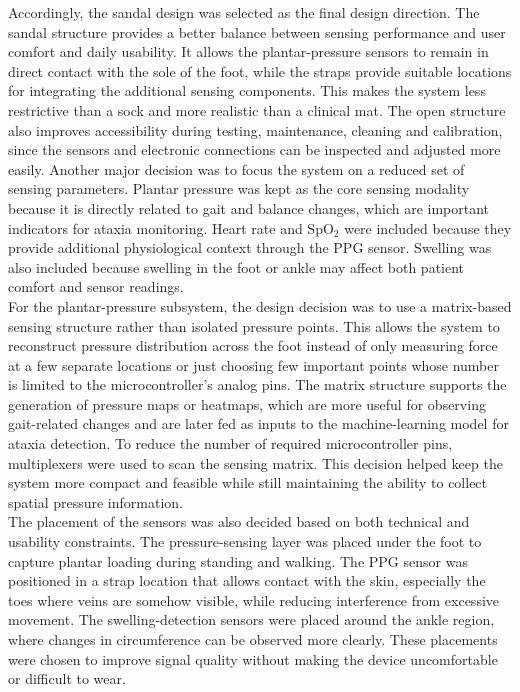 Accordingly, the sandal design was selected as the final design direction. The sandal structure provides a better balance between sensing performance and user comfort and daily usability. It allows the plantar-pressure sensors to remain in direct contact with the sole of the foot, while the straps provide suitable locations for integrating the additional sensing components. This makes the system less restrictive than a sock and more realistic than a clinical mat. The open structure also improves accessibility during testing, maintenance, cleaning and calibration, since the sensors and electronic connections can be inspected and adjusted more easily. Another major decision was to focus the system on a reduced set of sensing parameters. Plantar pressure was kept as the core sensing modality because it is directly related to gait and balance changes, which are important indicators for ataxia monitoring. Heart rate and SpO$_2$ were included because they provide additional physiological context through the PPG sensor. Swelling was also included because swelling in the foot or ankle may affect both patient comfort and sensor readings. \\ %

 For the plantar-pressure subsystem, the design decision was to use a matrix-based sensing structure rather than isolated pressure points. This allows the system to reconstruct pressure distribution across the foot instead of only measuring force at a few separate locations or just choosing few important points whose number is limited to the microcontroller's analog pins. The matrix structure supports the generation of pressure maps or heatmaps, which are more useful for observing gait-related changes and are later fed as inputs to the machine-learning model for ataxia detection. To reduce the number of required microcontroller pins, multiplexers were used to scan the sensing matrix. This decision helped keep the system more compact and feasible while still maintaining the ability to collect spatial pressure information. \\

The placement of the sensors was also decided based on both technical and usability constraints. The pressure-sensing layer was placed under the foot to capture plantar loading during standing and walking. The PPG sensor was positioned in a strap location that allows contact with the skin, especially the toes where veins are somehow visible, while reducing interference from excessive movement. The swelling-detection sensors were placed around the ankle region, where changes in circumference can be observed more clearly. These placements were chosen to improve signal quality without making the device uncomfortable or difficult to wear. \\

